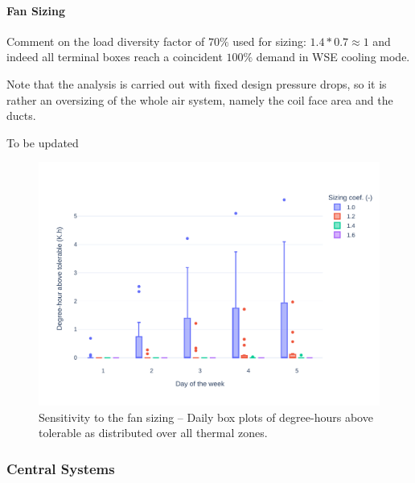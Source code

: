 \paragraph{Fan Sizing} \label{par:fan}

Comment on the load diversity factor of $70\%$ used for sizing:
$1.4 * 0.7 \approx 1$ and indeed all terminal boxes reach a coincident $100\%$ demand in WSE cooling mode.

Note that the analysis is carried out with fixed design pressure drops, so it is rather an oversizing of the whole air system, namely the coil face area and the ducts.

To be updated



\begin{figure}[!htbp]
\centering
\includegraphics[width=.7\linewidth]{../python_scripts/figures/FanSizing.pdf}
\caption{Sensitivity to the fan sizing -- Daily box plots of degree-hours above tolerable as distributed over all thermal zones.}
\label{fig:fan}
\end{figure}


\subsubsection{Central Systems} \label{sec:dhc}

